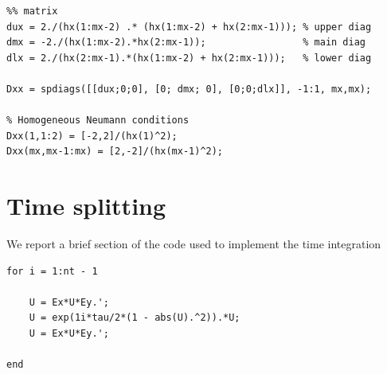 \begin{lstlisting}
%% matrix
dux = 2./(hx(1:mx-2) .* (hx(1:mx-2) + hx(2:mx-1))); % upper diag 
dmx = -2./(hx(1:mx-2).*hx(2:mx-1));                 % main diag
dlx = 2./(hx(2:mx-1).*(hx(1:mx-2) + hx(2:mx-1)));   % lower diag

Dxx = spdiags([[dux;0;0], [0; dmx; 0], [0;0;dlx]], -1:1, mx,mx);

% Homogeneous Neumann conditions 
Dxx(1,1:2) = [-2,2]/(hx(1)^2);
Dxx(mx,mx-1:mx) = [2,-2]/(hx(mx-1)^2);
\end{lstlisting}

\section*{Time splitting}

We report a brief section of the code used to implement the time integration

\begin{lstlisting}
for i = 1:nt - 1

    U = Ex*U*Ey.';
    U = exp(1i*tau/2*(1 - abs(U).^2)).*U;
    U = Ex*U*Ey.';
 
end
\end{lstlisting}